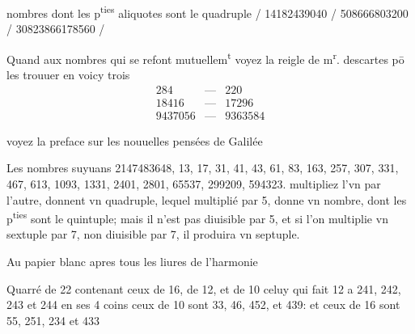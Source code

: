 \documentclass[11pt,a4paper]{article}
\begin{document}
nombres dont les p\textsuperscript{ties} aliquotes sont le quadruple / 14182439040 / 508666803200 / 30823866178560 /

Quand aux nombres qui se refont mutuellem\textsuperscript{t} voyez la reigle de m\textsuperscript{r}. descartes pō les trouuer en voicy trois
\[
\begin{array}{|lcl|}
284 & — & 220 \\
18416 & — & 17296 \\
9437056 & — & 9363584
\end{array}
\]

voyez la preface sur les nouuelles pensées de Galilée

Les nombres suyuans 2147483648, 13, 17, 31, 41, 43, 61, 83, 163, 257, 307, 331, 467, 613, 1093, 1331, 2401, 2801, 65537, 299209, 594323. multipliez l'vn par l'autre, donnent vn quadruple, lequel multiplié par 5, donne vn nombre, dont les p\textsuperscript{ties} sont le quintuple; mais il n'est pas diuisible par 5, et si l'on multiplie vn sextuple par 7, non diuisible par 7, il produira vn septuple.


Au papier blanc apres tous les liures de l'harmonie

Quarré de 22 contenant ceux de 16, de 12, et de 10 celuy qui fait 12 a 241, 242, 243 et 244 en ses 4 coins ceux de 10 sont 33, 46, 452, et 439: et ceux de 16 sont 55, 251, 234 et 433
\end{document}
